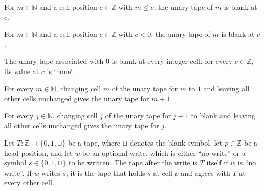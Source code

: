 \begin{theorem}
\label{Turing.UnaryTape.ones_ge}
\leanok
{}
For $m\in\mathbb{N}$ and a cell position $c\in\mathbb{Z}$ with $m\le c$, the unary tape
of $m$ is blank at $c$.
\end{theorem}

\begin{theorem}
\label{Turing.UnaryTape.ones_neg}
\leanok
{}
For $m\in\mathbb{N}$ and a cell position $c\in\mathbb{Z}$ with $c<0$, the unary tape of
$m$ is blank at $c$.
\end{theorem}

\begin{theorem}
\label{Turing.UnaryTape.ones_zero}
\leanok
{}
The unary tape associated with $0$ is blank at every integer cell: for every
$c\in\mathbb{Z}$, its value at $c$ is `none`.
\end{theorem}

\begin{theorem}
\label{Turing.UnaryTape.update_ones_succ}
\leanok
{}
For every $m\in\mathbb{N}$, changing cell $m$ of the unary tape for $m$ to $1$ and
leaving all other cells unchanged gives the unary tape for $m+1$.
\end{theorem}

\begin{theorem}
\label{Turing.UnaryTape.update_ones_pred}
\leanok
{}
For every $j\in\mathbb{N}$, changing cell $j$ of the unary tape for $j+1$ to blank and
leaving all other cells unchanged gives the unary tape for $j$.
\end{theorem}

\begin{definition}
\label{Turing.UnaryTape.wrT}
\leanok
Let $T : \mathbb{Z} \to \{0, 1, \sqcup\}$ be a tape, where $\sqcup$ denotes the blank symbol, let
$p \in \mathbb{Z}$ be a head position, and let $w$ be an optional write, which is either
``no write'' or a symbol $s \in \{0, 1, \sqcup\}$ to be written. The tape after the write is $T$
itself if $w$ is ``no write''. If $w$ writes $s$, it is the tape that holds $s$ at cell $p$ and
agrees with $T$ at every other cell.
\end{definition}
